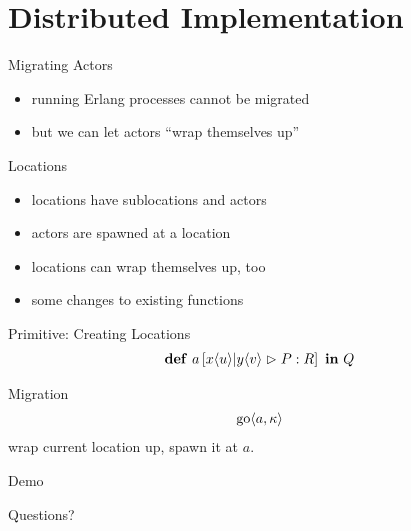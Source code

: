 \documentclass[]{beamer}
\begin{document}
    \begin{frame}{}
    \end{frame}

    \begin{frame}{}
    \end{frame}

  \section{Distributed Implementation}

    \begin{frame}{Migrating Actors}
      \begin{itemize}
    \item running Erlang processes cannot be migrated\\
    \item but we can let actors ``wrap themselves up''
      \end{itemize}
    \end{frame}

    \begin{frame}{Locations}
      \begin{itemize}
    \item locations have sublocations and actors
    \item actors are spawned at a location
    \item locations can wrap themselves up, too
    \item some changes to existing functions
      \end{itemize}
    \end{frame}

    \begin{frame}{Primitive: Creating Locations}
      \begin{align*}
        \textbf{\textup{def}} \ a \left[ x\langle u\rangle | y\langle v\rangle \vartriangleright P : R \right] \ \textbf{\textup{in}} \ Q
      \end{align*}
    \end{frame}

    \begin{frame}{Migration}
      \begin{align*}
        \operatorname{go} \langle a, \kappa \rangle
      \end{align*}
      \center
      wrap current location up, spawn it at $a$.
    \end{frame}

    \begin{frame}{}
      Demo
    \end{frame}

    \begin{frame}{}
      Questions?
    \end{frame}
\end{document}
